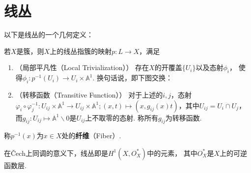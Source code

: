 \section{线丛}
    以下是线丛的一个几何定义：
    \begin{definition}
        若$X$是簇，则$X$上的线丛指簇的映射$p\colon L \rightarrow X$，满足
        \begin{enumerate}
            \item[(1)]（局部平凡性（Local Trivialization））
                       存在$X$的开覆盖$\{U_{i}\}$以及态射$\phi_{i}$，
                       使得$\phi_{i}\colon p^{-1}(U_{i}) \rightarrow U_{i} \times \mathbb{A}^{1}$. 
                       换句话说，即下图交换：
            \item[(2)]（转移函数（Transitive Function））
                       对于上述的$i,j$，态射
                       $\varphi_{i} \circ \varphi_{j}^{-1}\colon U_{ij} \times \mathbb{A}^{1} \rightarrow U_{ij} \times \mathbb{A}^{1};
                       (x,t) \mapsto (x,g_{ij}(x)t)$，其中$U_{ij}=U_{i} \cap U_{j}$， 
                       而$g_{ij}\colon U_{ij} \mapsto \mathbb{A}^{1}\backslash 0$是$U_{ij}$上不取零的态射.
                       称所有$g_{ij}$为转移函数.
        \end{enumerate}
        称$p^{-1}(x)$为$x \in X$处的\textbf{纤维}（Fiber）.
    \end{definition}

    \begin{remark}
        在Čech上同调的意义下，线丛即是$H^{1}(X,O_{X}^{*})$中的元素，
        其中$O_{X}^{*}$是$X$上的可逆函数层.
    \end{remark}

